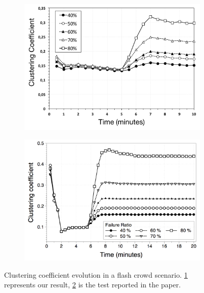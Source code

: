 \begin{figure}
\centering
\begin{subfigure}{.5\textwidth}
  \centering
  \includegraphics[keepaspectratio=true, width=1\linewidth]{images/average_clustering_coefficient_failures}
  \caption{}
  \label{fig:average_clustering_coefficient_failures}
\end{subfigure}%
\begin{subfigure}{.5\textwidth}
  \centering
  \includegraphics[keepaspectratio=true, width=1\linewidth]{images/paper_average_clustering_coefficient_failures}
  \caption{}
  \label{fig:paper_average_clustering_coefficient_failures}
\end{subfigure}
\caption{Clustering coefficient evolution in a flash crowd scenario. \ref{fig:average_clustering_coefficient_failures} represents our result, \ref{fig:paper_average_clustering_coefficient_failures} is the test reported in the paper.}
\label{fig:robustness_clustering_coefficient_failures}
\end{figure}

